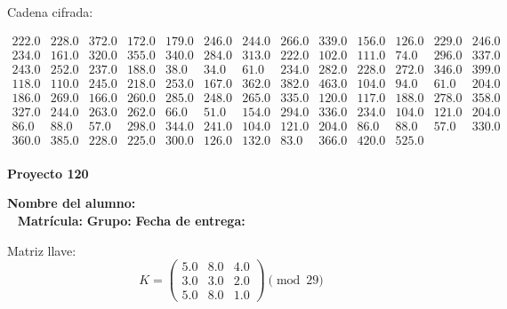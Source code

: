 \documentclass[12pt]{article}
\begin{document}
Cadena cifrada:
\begin{center}
$\begin{array}{lllllllllllll}
222.0 & 228.0 & 372.0 & 172.0 & 179.0 & 246.0 & 244.0 & 266.0 & 339.0 & 156.0 & 126.0 & 229.0 & 246.0\\
234.0 & 161.0 & 320.0 & 355.0 & 340.0 & 284.0 & 313.0 & 222.0 & 102.0 & 111.0 & 74.0 & 296.0 & 337.0\\
243.0 & 252.0 & 237.0 & 188.0 & 38.0 & 34.0 & 61.0 & 234.0 & 282.0 & 228.0 & 272.0 & 346.0 & 399.0\\
118.0 & 110.0 & 245.0 & 218.0 & 253.0 & 167.0 & 362.0 & 382.0 & 463.0 & 104.0 & 94.0 & 61.0 & 204.0\\
186.0 & 269.0 & 166.0 & 260.0 & 285.0 & 248.0 & 265.0 & 335.0 & 120.0 & 117.0 & 188.0 & 278.0 & 358.0\\
327.0 & 244.0 & 263.0 & 262.0 & 66.0 & 51.0 & 154.0 & 294.0 & 336.0 & 234.0 & 104.0 & 121.0 & 204.0\\
86.0 & 88.0 & 57.0 & 298.0 & 344.0 & 241.0 & 104.0 & 121.0 & 204.0 & 86.0 & 88.0 & 57.0 & 330.0\\
360.0 & 385.0 & 228.0 & 225.0 & 300.0 & 126.0 & 132.0 & 83.0 & 366.0 & 420.0 & 525.0\\
\end{array}$
\end{center}

\newpage


\textbf{Proyecto 120}

\textbf{Nombre del alumno:} \underline{\hspace{13cm}}\\\
\vspace{1cm}
\textbf{Matrícula:} \underline{\hspace{4cm}} \hspace{1cm}
\textbf{Grupo:} \underline{\hspace{2cm}}
\textbf{Fecha de entrega:} \underline{\hspace{2cm}}

\medskip

Matriz llave:
\[
K = \begin{pmatrix}
5.0 & 8.0 & 4.0\\
3.0 & 3.0 & 2.0\\
5.0 & 8.0 & 1.0
\end{pmatrix} \pmod{29}
\]
\end{document}

